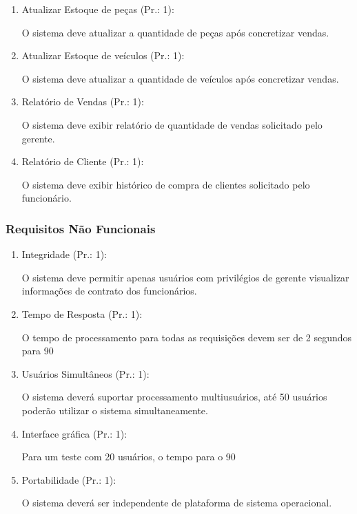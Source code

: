 \begin{enumerate}[
	label=RF\arabic{*}, 
	ref=(RF\arabic{*}),
	leftmargin=1.5em,
	itemindent=4.5em]
\item Atualizar Estoque de peças (Pr.: 1):\par
O sistema deve atualizar a quantidade de peças após concretizar vendas.\par

\item Atualizar Estoque de veículos (Pr.: 1):\par
O sistema deve atualizar a quantidade de veículos após concretizar vendas.\par

\item Relatório de Vendas (Pr.: 1):\par
O sistema deve exibir relatório de quantidade de vendas solicitado pelo gerente.\par

\item Relatório de Cliente (Pr.: 1):\par
O sistema deve exibir histórico de compra de clientes solicitado pelo funcionário. \par


\end{enumerate}

\subsubsection{Requisitos Não Funcionais}



\begin{enumerate}[
	label=RNF\arabic{*}, 
	ref=(RNF\arabic{*}),
	leftmargin=1.5em,
	itemindent=4.5em]
	
	\item Integridade (Pr.: 1):\par
	O sistema deve permitir apenas usuários com privilégios de gerente visualizar informações de contrato dos funcionários.\par
	
	\item Tempo de Resposta (Pr.: 1):\par
	O tempo de processamento para todas as requisições devem ser de 2 segundos para  90%
	
	\item Usuários Simultâneos (Pr.: 1):\par
	O sistema deverá suportar processamento multiusuários, até 50 usuários poderão utilizar o sistema simultaneamente. \par
	
	\item Interface gráfica (Pr.: 1):\par
	Para um teste com 20 usuários, o tempo para o 90%
	
	\item Portabilidade (Pr.: 1):\par
	O sistema deverá ser independente de plataforma de sistema operacional. \par
\end{enumerate}

